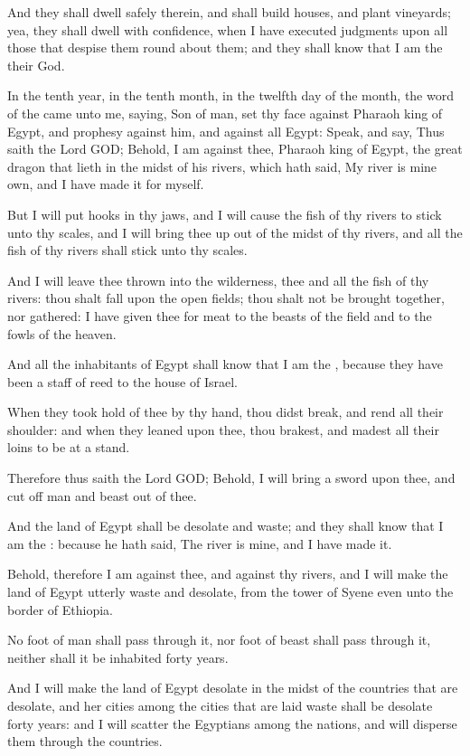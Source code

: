 \Verse And they shall dwell safely therein, and shall build houses, and plant vineyards; yea, they shall dwell with confidence, when I have executed judgments upon all those that despise them round about them; and they shall know that I am the \LORD their God.


\Chapter
\Verse In the tenth year, in the tenth month, in the twelfth day of the month, the word of the \LORD came unto me, saying, \Verse Son of man, set thy face against Pharaoh king of Egypt, and prophesy against him, and against all Egypt: \Verse Speak, and say, Thus saith the Lord GOD; Behold, I am against thee, Pharaoh king of Egypt, the great dragon that lieth in the midst of his rivers, which hath said, My river is mine own, and I have made it for myself.

\Verse But I will put hooks in thy jaws, and I will cause the fish of thy rivers to stick unto thy scales, and I will bring thee up out of the midst of thy rivers, and all the fish of thy rivers shall stick unto thy scales.

\Verse And I will leave thee thrown into the wilderness, thee and all the fish of thy rivers: thou shalt fall upon the open fields; thou shalt not be brought together, nor gathered: I have given thee for meat to the beasts of the field and to the fowls of the heaven.

\Verse And all the inhabitants of Egypt shall know that I am the \LORD, because they have been a staff of reed to the house of Israel.

\Verse When they took hold of thee by thy hand, thou didst break, and rend all their shoulder: and when they leaned upon thee, thou brakest, and madest all their loins to be at a stand.

\Verse Therefore thus saith the Lord GOD; Behold, I will bring a sword upon thee, and cut off man and beast out of thee.

\Verse And the land of Egypt shall be desolate and waste; and they shall know that I am the \LORD: because he hath said, The river is mine, and I have made it.

\Verse Behold, therefore I am against thee, and against thy rivers, and I will make the land of Egypt utterly waste and desolate, from the tower of Syene even unto the border of Ethiopia.

\Verse No foot of man shall pass through it, nor foot of beast shall pass through it, neither shall it be inhabited forty years.

\Verse And I will make the land of Egypt desolate in the midst of the countries that are desolate, and her cities among the cities that are laid waste shall be desolate forty years: and I will scatter the Egyptians among the nations, and will disperse them through the countries.

